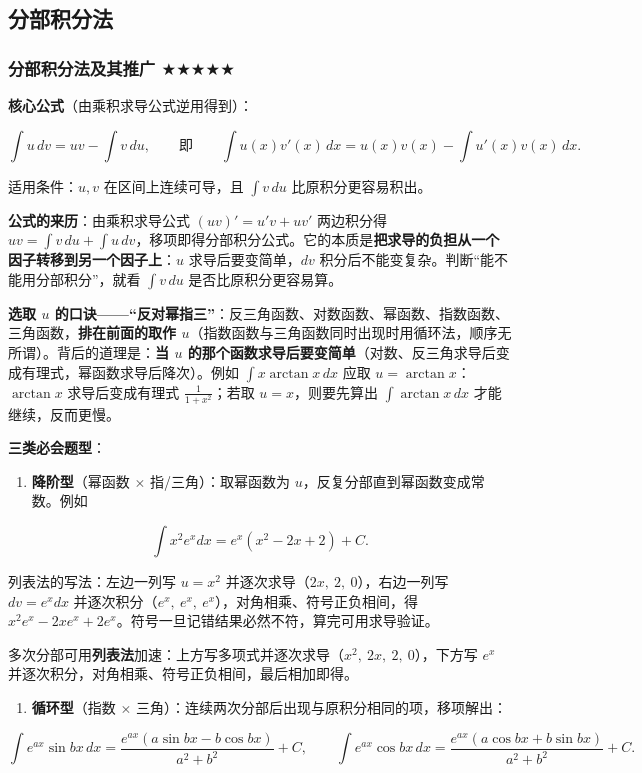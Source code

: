 \documentclass[11pt,openany,UTF8]{ctexbook}
\begin{document}
\subsection{分部积分法}

\subsubsection{分部积分法及其推广 $\bigstar$$\bigstar$$\bigstar$$\bigstar$$\bigstar$}

\textbf{核心公式}（由乘积求导公式逆用得到）：

\[\int u\,dv=uv-\int v\,du,\qquad\text{即}\qquad \int u(x)v'(x)\,dx=u(x)v(x)-\int u'(x)v(x)\,dx.\]

适用条件：$u,v$ 在区间上连续可导，且 $\int v\,du$ 比原积分更容易积出。

\textbf{公式的来历}：由乘积求导公式 $(uv)'=u'v+uv'$ 两边积分得 $uv=\int v\,du+\int u\,dv$，移项即得分部积分公式。它的本质是\textbf{把求导的负担从一个因子转移到另一个因子上}：$u$ 求导后要变简单，$dv$ 积分后不能变复杂。判断“能不能用分部积分”，就看 $\int v\,du$ 是否比原积分更容易算。

\textbf{选取 $u$ 的口诀——“反对幂指三”}：反三角函数、对数函数、幂函数、指数函数、三角函数，\textbf{排在前面的取作 $u$}（指数函数与三角函数同时出现时用循环法，顺序无所谓）。背后的道理是：\textbf{当 $u$ 的那个函数求导后要变简单}（对数、反三角求导后变成有理式，幂函数求导后降次）。例如 $\int x\arctan x\,dx$ 应取 $u=\arctan x$：$\arctan x$ 求导后变成有理式 $\frac{1}{1+x^2}$；若取 $u=x$，则要先算出 $\int\arctan x\,dx$ 才能继续，反而更慢。

\textbf{三类必会题型}：

\begin{enumerate}
\item \textbf{降阶型}（幂函数 $\times$ 指/三角）：取幂函数为 $u$，反复分部直到幂函数变成常数。例如
\end{enumerate}
\[\int x^2e^{x}dx=e^{x}(x^2-2x+2)+C.\]

列表法的写法：左边一列写 $u=x^2$ 并逐次求导（$2x,\ 2,\ 0$），右边一列写 $dv=e^{x}dx$ 并逐次积分（$e^{x},\ e^{x},\ e^{x}$），对角相乘、符号正负相间，得 $x^2e^{x}-2xe^{x}+2e^{x}$。符号一旦记错结果必然不符，算完可用求导验证。

多次分部可用\textbf{列表法}加速：上方写多项式并逐次求导（$x^2,\ 2x,\ 2,\ 0$），下方写 $e^x$ 并逐次积分，对角相乘、符号正负相间，最后相加即得。

\begin{enumerate}
\item \textbf{循环型}（指数 $\times$ 三角）：连续两次分部后出现与原积分相同的项，移项解出：
\end{enumerate}
\[\int e^{ax}\sin bx\,dx=\frac{e^{ax}\left(a\sin bx-b\cos bx\right)}{a^2+b^2}+C,\qquad \int e^{ax}\cos bx\,dx=\frac{e^{ax}\left(a\cos bx+b\sin bx\right)}{a^2+b^2}+C.\]
\end{document}
